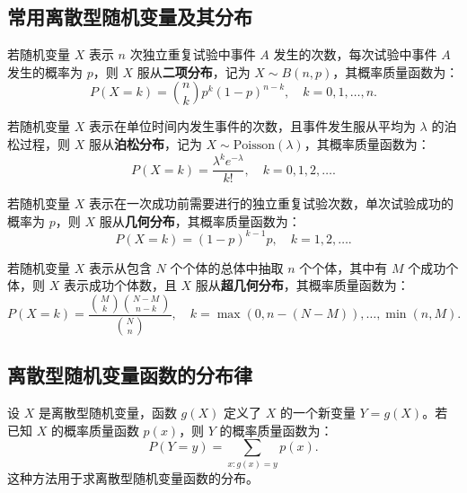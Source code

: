 \documentclass[UTF8]{ctexart}
\begin{document}
	\subsection{常用离散型随机变量及其分布}
	
	\begin{tcolorbox}[colback=definition!5!white, colframe=definition!75!black, title=二项分布]
		若随机变量 $X$ 表示 $n$ 次独立重复试验中事件 $A$ 发生的次数，每次试验中事件 $A$ 发生的概率为 $p$，则 $X$ 服从\textbf{二项分布}，记为 $X \sim B(n, p)$，其概率质量函数为：
		\[
		P(X = k) = \binom{n}{k} p^k (1 - p)^{n - k}, \quad k = 0, 1, \dots, n.
		\]
	\end{tcolorbox}
	
	\begin{tcolorbox}[colback=definition!5!white, colframe=definition!75!black, title=泊松分布]
		若随机变量 $X$ 表示在单位时间内发生事件的次数，且事件发生服从平均为 $\lambda$ 的泊松过程，则 $X$ 服从\textbf{泊松分布}，记为 $X \sim \text{Poisson}(\lambda)$，其概率质量函数为：
		\[
		P(X = k) = \frac{\lambda^k e^{-\lambda}}{k!}, \quad k = 0, 1, 2, \dots.
		\]
	\end{tcolorbox}
	
	\begin{tcolorbox}[colback=definition!5!white, colframe=definition!75!black, title=几何分布]
		若随机变量 $X$ 表示在一次成功前需要进行的独立重复试验次数，单次试验成功的概率为 $p$，则 $X$ 服从\textbf{几何分布}，其概率质量函数为：
		\[
		P(X = k) = (1 - p)^{k - 1} p, \quad k = 1, 2, \dots.
		\]
	\end{tcolorbox}
	
	\begin{tcolorbox}[colback=definition!5!white, colframe=definition!75!black, title=超几何分布]
		若随机变量 $X$ 表示从包含 $N$ 个个体的总体中抽取 $n$ 个个体，其中有 $M$ 个成功个体，则 $X$ 表示成功个体数，且 $X$ 服从\textbf{超几何分布}，其概率质量函数为：
		\[
		P(X = k) = \frac{\binom{M}{k} \binom{N - M}{n - k}}{\binom{N}{n}}, \quad k = \max(0, n - (N - M)), \dots, \min(n, M).
		\]
	\end{tcolorbox}
	
	\subsection{离散型随机变量函数的分布律}
	
	\begin{tcolorbox}[colback=definition!5!white, colframe=definition!75!black, title=离散型随机变量函数的分布律]
		设 $X$ 是离散型随机变量，函数 $g(X)$ 定义了 $X$ 的一个新变量 $Y = g(X)$。若已知 $X$ 的概率质量函数 $p(x)$，则 $Y$ 的概率质量函数为：
		\[
		P(Y = y) = \sum_{x: g(x) = y} p(x).
		\]
		这种方法用于求离散型随机变量函数的分布。
	\end{tcolorbox}
	
\end{document}
